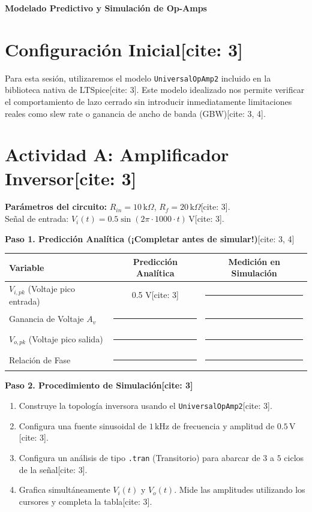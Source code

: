 \documentclass[11pt, a4paper]{article}
\begin{document}
\begin{tcolorbox}[colback=ucbblue!5!white, colframe=ucbblue, title=\textbf{Guía de Ejercicio LTSpice: Verificación de Configuraciones Clásicas}]
    \centering \large \textbf{Modelado Predictivo y Simulación de Op-Amps}
\end{tcolorbox}

\section*{Configuración Inicial[cite: 3]}
Para esta sesión, utilizaremos el modelo \texttt{UniversalOpAmp2} incluido en la biblioteca nativa de LTSpice[cite: 3]. Este modelo idealizado nos permite verificar el comportamiento de lazo cerrado sin introducir inmediatamente limitaciones reales como slew rate o ganancia de ancho de banda (GBW)[cite: 3, 4].

\section*{Actividad A: Amplificador Inversor[cite: 3]}
\textbf{Parámetros del circuito:}
$R_{in} = 10\,\text{k}\Omega$, $R_f = 20\,\text{k}\Omega$[cite: 3]. \\
Señal de entrada: $V_i(t) = 0.5 \sin(2\pi \cdot 1000 \cdot t)\,\text{V}$[cite: 3].

\vspace{0.2cm}
\textbf{Paso 1. Predicción Analítica (¡Completar antes de simular!)}[cite: 3, 4]
\begin{table}[h!]
    \centering
    \renewcommand{\arraystretch}{1.4}
    \begin{tabular}{l|c|c}
    \toprule
    \rowcolor[HTML]{EFEFEF}
    \textbf{Variable} & \textbf{Predicción Analítica} & \textbf{Medición en Simulación} \\ \midrule
    $V_{i, pk}$ (Voltaje pico entrada) & 0.5 V[cite: 3] & \rule{3cm}{0.4pt} \\
    Ganancia de Voltaje $A_v$ & \rule{3cm}{0.4pt} & \rule{3cm}{0.4pt} \\
    $V_{o, pk}$ (Voltaje pico salida) & \rule{3cm}{0.4pt} & \rule{3cm}{0.4pt} \\
    Relación de Fase & \rule{3cm}{0.4pt} & \rule{3cm}{0.4pt} \\
    \bottomrule
    \end{tabular}
\end{table}

\textbf{Paso 2. Procedimiento de Simulación[cite: 3]}
\begin{enumerate}
    \item Construye la topología inversora usando el \texttt{UniversalOpAmp2}[cite: 3].
    \item Configura una fuente sinusoidal de $1\,\text{kHz}$ de frecuencia y amplitud de $0.5\,\text{V}$[cite: 3].
    \item Configura un análisis de tipo \texttt{.tran} (Transitorio) para abarcar de $3$ a $5$ ciclos de la señal[cite: 3].
    \item Grafica simultáneamente $V_i(t)$ y $V_o(t)$. Mide las amplitudes utilizando los cursores y completa la tabla[cite: 3].
\end{enumerate}
\end{document}
